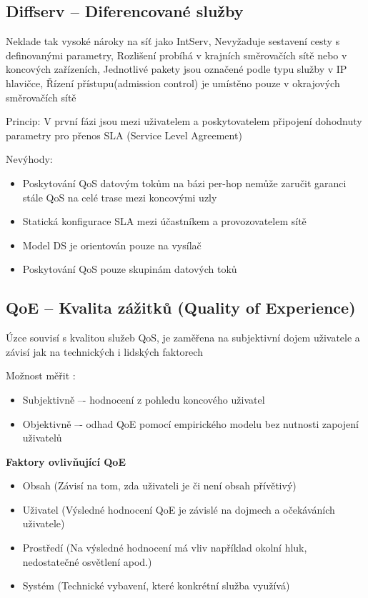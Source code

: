 \subsection{Diffserv -- Diferencované služby}
Neklade tak vysoké nároky na síť jako IntServ, Nevyžaduje sestavení cesty s definovanými parametry, Rozlišení probíhá v krajních směrovačích sítě nebo v koncových zařízeních, Jednotlivé pakety jsou označené podle typu služby v IP hlavičce, Řízení přístupu(admission control) je umístěno pouze v okrajových směrovačích sítě

Princip: V první fázi jsou mezi uživatelem a poskytovatelem připojení dohodnuty parametry pro přenos SLA (Service Level Agreement)

Nevýhody: 
\begin{itemize}
    \item Poskytování QoS datovým tokům na bázi per-hop nemůže zaručit garanci stále QoS na celé trase mezi koncovými uzly
    \item Statická konfigurace SLA mezi účastníkem a provozovatelem sítě
    \item Model DS je orientován pouze na vysílač
    \item Poskytování QoS pouze skupinám datových toků
\end{itemize}

\subsection{QoE -- Kvalita zážitků (Quality of Experience)}
Úzce souvisí s kvalitou služeb QoS, je zaměřena na subjektivní dojem uživatele a závisí jak na technických i
lidských faktorech

Možnost měřit : 
\begin{itemize}
    \item Subjektivně –- hodnocení z pohledu koncového uživatel
    \item Objektivně –- odhad QoE pomocí empirického modelu bez nutnosti zapojení uživatelů
\end{itemize}

\textbf{Faktory ovlivňující QoE}
\begin{itemize}
    \item Obsah (Závisí na tom, zda uživateli je či není obsah přívětivý)
    \item Uživatel (Výsledné hodnocení QoE je závislé na dojmech a očekáváních uživatele)
    \item Prostředí (Na výsledné hodnocení má vliv například okolní hluk, nedostatečné osvětlení apod.)
    \item Systém (Technické vybavení, které konkrétní služba využívá)
\end{itemize}

